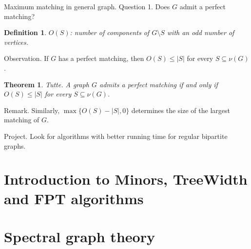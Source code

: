 \documentclass[12pt,a4paper]{article} \usepackage{fontspec}
\newtheorem{theorem}{Theorem} \newtheorem{definition}{Definition}
\begin{document}
Maximum matching in general graph.  Question 1.  Does \(G\) admit a perfect
matching?

\begin{definition} \(O(S)\): number of components of \(G \setminus S\) with an
odd number of vertices.  \end{definition}

Observation.  If \(G\) has a perfect matching, then \(O(S) \leq |S|\) for every
\(S \subseteq \nu(G)\).

\begin{theorem} Tutte.  A graph \(G\) admits a perfect matching if and only if
\(O(S) \leq |S|\) for every \(S \subseteq \nu(G)\).  \end{theorem}

Remark.  Similarly, \(\max\{O(S) - |S|, 0\}\) determines the size of the largest
matching of \(G\).

Project.  Look for algorithms with better running time for regular bipartite
graphs.

\section{Introduction to Minors, TreeWidth and FPT algorithms} \section{Spectral
graph theory}
\end{document}
